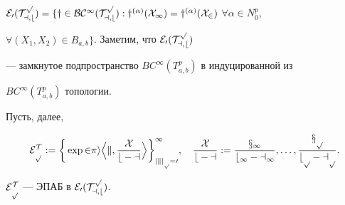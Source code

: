 $\cal{E}_0(T_{a,b}^p)=\{y\in BC^{\infty}


(T_{a,b}^p):y^{(\alpha)}(X_1)=y^{(\alpha)}(X_2)$ $\forall\alpha\in N_0^p$,


$\forall(X_1,X_2)\in B_{a,b}\}$. Заметим, что $\cal{E}_0(T_{a,b}^p)$


--- замкнутое подпространство $BC^{\infty}(T_{a,b}^p)$ в индуцированной из


$BC^{\infty}(T_{a,b}^p)$ топологии.





Пусть, далее,


$$


\cal{E}^T_p:=\bigg\{\exp 2\pi i\Big\langle k,\frac{X}{b-


a}\Big\rangle\bigg\}^{\infty}_{|k|_p=0},\quad


\frac{X}{b-a}:=\frac{x_1}{b_1-a_1},\dotsc,\frac{x_p}{b_p-a_p}.


$$





\begin{thm}


$\cal{E} ^T_p$ --- ЭПАБ в $\cal{E} _0(T_{a,b}^p)$.


\end{thm}








